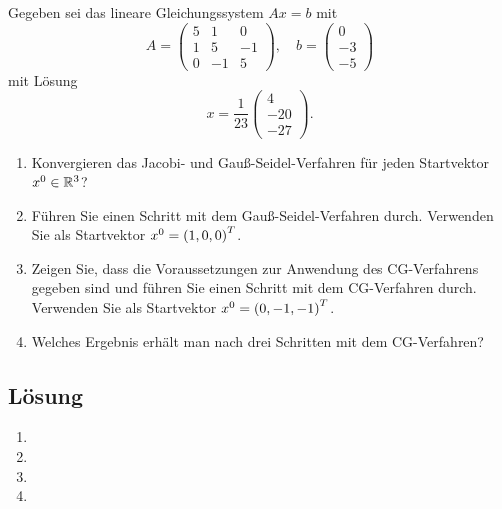 \documentclass{exercise}
\begin{document}
    \begin{problem}
        Gegeben sei das lineare Gleichungssystem \(Ax = b\) mit
        \[
            A = \begin{pmatrix}
                5 & 1 & 0\\
                1 & 5 & -1\\
                0 & -1 & 5
            \end{pmatrix}, \quad b = \begin{pmatrix}
                0\\
                -3\\
                -5
            \end{pmatrix}
        \]
        mit Lösung
        \[
            x = \frac{1}{23}\begin{pmatrix}
                4\\
                -20\\
                -27
            \end{pmatrix}.
        \]
        \begin{enumerate}
            \item Konvergieren das Jacobi- und Gauß-Seidel-Verfahren für jeden Startvektor \(x^0 \in \R^3\)?
            \item Führen Sie einen Schritt mit dem Gauß-Seidel-Verfahren durch.
            Verwenden Sie als Startvektor \(x^0 = \parentheses*{1, 0, 0}^T\).
            \item Zeigen Sie, dass die Voraussetzungen zur Anwendung des CG-Verfahrens gegeben sind und führen Sie einen Schritt mit dem CG-Verfahren durch.
            Verwenden Sie als Startvektor \(x^0 = \parentheses*{0, -1, -1}^T\).
            \item Welches Ergebnis erhält man nach drei Schritten mit dem CG-Verfahren?
        \end{enumerate}
    \end{problem}
    
    \subsection*{Lösung}
    \begin{enumerate}
        \item
        \item
        \item
        \item
    \end{enumerate}
\end{document}
